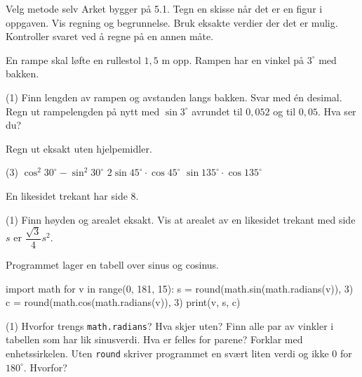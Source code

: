 
\begin{infoboks}{Velg metode selv}
Arket bygger på 5.1. Tegn en skisse når det er en figur i oppgaven. Vis regning og begrunnelse.
Bruk eksakte verdier der det er mulig. Kontroller svaret ved å regne på en annen måte.
\end{infoboks}


En rampe skal løfte en rullestol $1,5$ m opp. Rampen har en vinkel på $3^\circ$ med bakken.
\begin{tasks}(1)
  \task Finn lengden av rampen og avstanden langs bakken. Svar med én desimal.
  \task Regn ut rampelengden på nytt med $\sin 3^\circ$ avrundet til $0,052$ og til $0,05$. Hva ser du?
\end{tasks}

Regn ut eksakt uten hjelpemidler.
\begin{tasks}(3)
  \task $\cos^2 30^\circ - \sin^2 30^\circ$
  \task $2 \sin 45^\circ \cdot \cos 45^\circ$
  \task $\sin 135^\circ \cdot \cos 135^\circ$
\end{tasks}

En likesidet trekant har side 8.
\begin{tasks}(1)
  \task Finn høyden og arealet eksakt.
  \task Vis at arealet av en likesidet trekant med side $s$ er $\dfrac{\sqrt3}{4}s^2$.
\end{tasks}

Programmet lager en tabell over sinus og cosinus.
\begin{kode}
import math
for v in range(0, 181, 15):
    s = round(math.sin(math.radians(v)), 3)
    c = round(math.cos(math.radians(v)), 3)
    print(v, s, c)
\end{kode}
\begin{tasks}(1)
  \task Hvorfor trengs \lstinline[style=laereverk,numbers=none,frame=none]|math.radians|? Hva skjer uten?
  \task Finn alle par av vinkler i tabellen som har lik sinusverdi. Hva er felles for parene? Forklar med enhetssirkelen.
  \task Uten \lstinline[style=laereverk,numbers=none,frame=none]|round| skriver programmet en svært liten verdi og ikke $0$ for $180^\circ$. Hvorfor?
\end{tasks}

